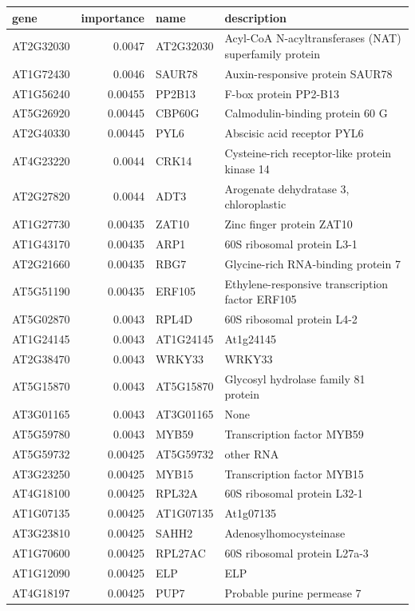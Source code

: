 \documentclass[11pt]{article}
\begin{document}
\begin{center}
\begin{tabular}{lrll}
gene & importance & name & description\\
\hline
AT2G32030 & 0.0047 & AT2G32030 & Acyl-CoA N-acyltransferases (NAT) superfamily protein\\
AT1G72430 & 0.0046 & SAUR78 & Auxin-responsive protein SAUR78\\
AT1G56240 & 0.00455 & PP2B13 & F-box protein PP2-B13\\
AT5G26920 & 0.00445 & CBP60G & Calmodulin-binding protein 60 G\\
AT2G40330 & 0.00445 & PYL6 & Abscisic acid receptor PYL6\\
AT4G23220 & 0.0044 & CRK14 & Cysteine-rich receptor-like protein kinase 14\\
AT2G27820 & 0.0044 & ADT3 & Arogenate dehydratase 3, chloroplastic\\
AT1G27730 & 0.00435 & ZAT10 & Zinc finger protein ZAT10\\
AT1G43170 & 0.00435 & ARP1 & 60S ribosomal protein L3-1\\
AT2G21660 & 0.00435 & RBG7 & Glycine-rich RNA-binding protein 7\\
AT5G51190 & 0.00435 & ERF105 & Ethylene-responsive transcription factor ERF105\\
AT5G02870 & 0.0043 & RPL4D & 60S ribosomal protein L4-2\\
AT1G24145 & 0.0043 & AT1G24145 & At1g24145\\
AT2G38470 & 0.0043 & WRKY33 & WRKY33\\
AT5G15870 & 0.0043 & AT5G15870 & Glycosyl hydrolase family 81 protein\\
AT3G01165 & 0.0043 & AT3G01165 & None\\
AT5G59780 & 0.0043 & MYB59 & Transcription factor MYB59\\
AT5G59732 & 0.00425 & AT5G59732 & other RNA\\
AT3G23250 & 0.00425 & MYB15 & Transcription factor MYB15\\
AT4G18100 & 0.00425 & RPL32A & 60S ribosomal protein L32-1\\
AT1G07135 & 0.00425 & AT1G07135 & At1g07135\\
AT3G23810 & 0.00425 & SAHH2 & Adenosylhomocysteinase\\
AT1G70600 & 0.00425 & RPL27AC & 60S ribosomal protein L27a-3\\
AT1G12090 & 0.00425 & ELP & ELP\\
AT4G18197 & 0.00425 & PUP7 & Probable purine permease 7\\

\end{tabular}
\end{center}
\end{document}
